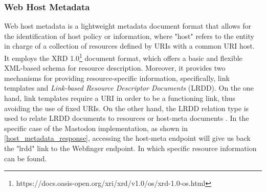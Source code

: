 



\subsubsection{Web Host Metadata}
    Web host metadata is a lightweight metadata document format that allows for the identification of host policy or information, where "host" refers to the entity in charge of a collection of resources defined by URIs with a common URI host. It employs the XRD 1.0\footnote{https://docs.oasis-open.org/xri/xrd/v1.0/os/xrd-1.0-os.html} document format, which offers a basic and flexible XML-based schema for resource description. Moreover,  it provides two mechanisms for providing resource-specific information, specifically,  link templates and \emph{Link-based Resource Descriptor Documents} (LRDD). On the one hand, link templates require a URI in order to be a functioning link, thus avoiding the use of fixed URIs. On the other hand, the LRDD relation type is used to relate LRDD documents to resources or host-meta documents \cite{cook_2011}. In the specific case of the Mastodon implementation, as shown in \ref{host_metadata_response}, accessing the host-meta endpoint will give us back the "lrdd" link to the Webfinger endpoint. In which specific resource information can be found. 

